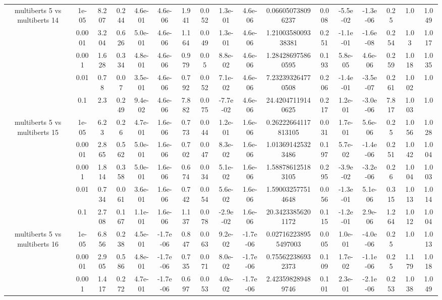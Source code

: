 \begin{tabular}{|c|c|c|c|c|c|c|c|c|c|c|c|c|c|c|c|c|}
\hline
\multirow{5}{*}{multiberts 5 vs multiberts 14} & 1e-05 & 8.207 & 0.244 & 4.6e-01 & 4.6e-06 & 1.941 & 0.052 & 1.3e-01 & 4.6e-06 & 0.066050738096237 & 0.008 & -5.5e-02 & -1.3e-06 & 0.25 & 1.0 & 1.049 \\
 & 0.0001 & 3.204 & 0.626 & 5.0e-01 & 4.6e-06 & 1.164 & 0.049 & 1.3e-01 & 4.6e-06 & 1.2100358009338381 & 0.251 & -1.1e-01 & -1.6e-08 & 0.254 & 1.03 & 1.017 \\
 & 0.001 & 1.628 & 0.334 & 4.8e-01 & 4.6e-06 & 0.979 & 0.05 & 8.8e-02 & 4.6e-06 & 1.284286975860595 & 0.193 & 5.8e-05 & 4.6e-06 & 0.259 & 1.018 & 1.035 \\
 & 0.01 & 0.78 & 0.07 & 3.5e-01 & 4.6e-06 & 0.792 & 0.052 & 7.1e-02 & 4.6e-06 & 7.232393264770508 & 0.206 & -1.4e-01 & -3.5e-07 & 0.261 & 1.002 & 1.0 \\
 & 0.1 & 2.3 & 0.249 & 9.4e-02 & 4.6e-06 & 7.882 & 0.075 & -7.7e-02 & 4.6e-06 & 24.42047119140625 & 0.217 & 1.2e-01 & -3.0e-06 & 7.817 & 1.003 & 1.0 \\
\hline
\multirow{5}{*}{multiberts 5 vs multiberts 15} & 1e-05 & 6.23 & 0.26 & 4.7e-01 & 1.6e-06 & 0.773 & 0.044 & 1.2e-01 & 1.6e-06 & 0.26222664117813105 & 0.031 & 1.7e-01 & 5.6e-06 & 0.25 & 1.056 & 1.028 \\
 & 0.0001 & 2.865 & 0.562 & 5.0e-01 & 1.6e-06 & 0.702 & 0.047 & 8.3e-02 & 1.6e-06 & 1.013691425323486 & 0.197 & 5.7e-02 & -1.4e-06 & 0.251 & 1.042 & 1.004 \\
 & 0.001 & 1.814 & 0.358 & 5.0e-01 & 1.6e-06 & 0.674 & 0.034 & 5.1e-02 & 1.6e-06 & 1.588786125183105 & 0.295 & -3.9e-02 & -3.2e-06 & 0.26 & 1.004 & 1.003 \\
 & 0.01 & 0.734 & 0.061 & 3.6e-01 & 1.6e-06 & 0.742 & 0.054 & 5.6e-02 & 1.6e-06 & 1.590032577514648 & 0.056 & -1.3e-01 & 5.1e-06 & 0.315 & 1.013 & 1.014 \\
 & 0.1 & 2.708 & 0.167 & 1.1e-01 & 1.6e-06 & 1.137 & 0.078 & -2.9e-02 & 1.6e-06 & 20.34233856201172 & 0.115 & -1.2e-01 & 2.9e-06 & 1.264 & 1.012 & 1.004 \\
\hline
\multirow{5}{*}{multiberts 5 vs multiberts 16} & 1e-05 & 6.856 & 0.238 & 4.5e-01 & -1.7e-06 & 0.847 & 0.063 & 9.2e-02 & -1.7e-06 & 0.027162238955497003 & 0.005 & 1.0e-01 & -4.0e-06 & 0.25 & 1.0 & 1.013 \\
 & 0.0001 & 2.905 & 0.586 & 4.8e-01 & -1.7e-06 & 0.735 & 0.071 & 8.0e-02 & -1.7e-06 & 0.755622386932373 & 0.109 & 1.7e-02 & -1.1e-06 & 0.25 & 1.179 & 1.018 \\
 & 0.001 & 1.417 & 0.272 & 4.7e-01 & -1.7e-06 & 0.697 & 0.053 & 4.0e-02 & -1.7e-06 & 2.423598289489746 & 0.101 & 2.3e-01 & -2.1e-06 & 0.253 & 1.038 & 1.049 \\

\end{tabular}
